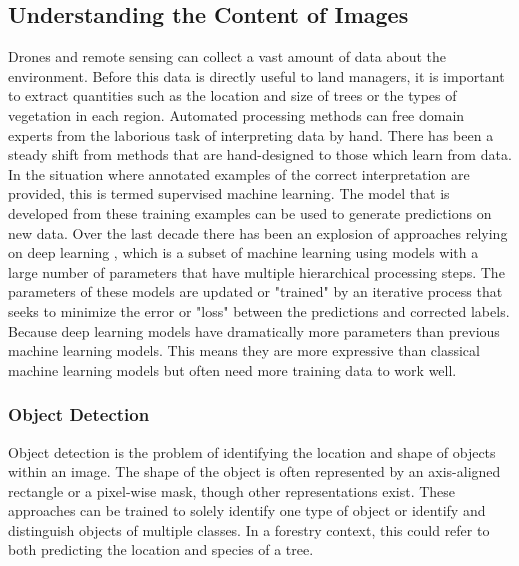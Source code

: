 \subsection{Understanding the Content of Images}
Drones and remote sensing can collect a vast amount of data about the environment. Before this data is directly useful to land managers, it is important to extract quantities such as the location and size of trees or the types of vegetation in each region. Automated processing methods can free domain experts from the laborious task of interpreting data by hand. There has been a steady shift from methods that are hand-designed to those which learn from data. In the situation where annotated examples of the correct interpretation are provided, this is termed supervised machine learning. 
The model that is developed from these training examples can be used to generate predictions on new data. Over the last decade there has been an explosion of approaches relying on deep learning \cite{Lecun2015DeepLearning}, which is a subset of machine learning using models with a large number of parameters that have multiple hierarchical processing steps. 
The parameters of these models are updated or "trained" by an iterative process that seeks to minimize the error or "loss" between the predictions and corrected labels. 
Because deep learning models have dramatically more parameters than previous machine learning models. This means they are more expressive than classical machine learning models but often need more training data to work well. 

\subsubsection{Object Detection}
Object detection is the problem of identifying the location and shape of objects within an image. The shape of the object is often represented by an axis-aligned rectangle or a pixel-wise mask, though other representations exist. These approaches can be trained to solely identify one type of object or identify and distinguish objects of multiple classes. In a forestry context, this could refer to both predicting the location and species of a tree. 

